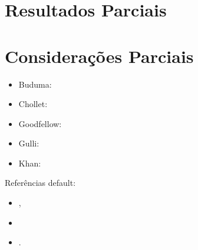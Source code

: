 \documentclass[12pt]{article}
\begin{document}
\section{Resultados Parciais} \label{sec:res-parc}


\section{Considerações Parciais} \label{sec:cons-parc}

\begin{itemize}
\item Buduma: \cite{buduma}
\item Chollet: \cite{chollet}
\item Goodfellow: \cite{goodfellow}
\item Gulli: \cite{gulli}
\item Khan: \cite{khan}
\end{itemize}

Referências default:

\begin{itemize}
\item \cite{knuth:84},
\item \cite{boulic:91}
\item \cite{smith:99}.
\end{itemize}






\end{document}
